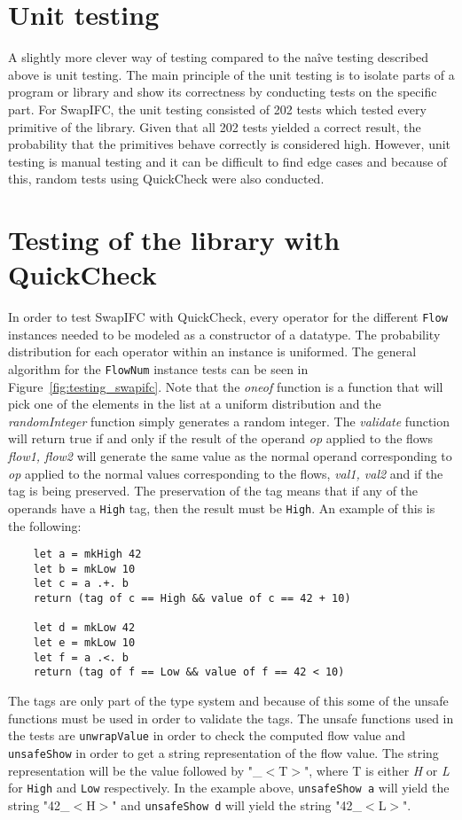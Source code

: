 \section{Unit testing}
A slightly more clever way of testing compared to the naîve testing described above is unit testing. The main principle of the unit testing is to isolate parts of a program or library and show its correctness by conducting tests on the specific part. For SwapIFC, the unit testing consisted of 202 tests which tested every primitive of the library. Given that all 202 tests yielded a correct result, the probability that the primitives behave correctly is considered high. However, unit testing is manual testing and it can be difficult to find edge cases and because of this, random tests using QuickCheck were also conducted.

\section{Testing of the library with QuickCheck}
In order to test SwapIFC with QuickCheck, every operator for the different {\tt Flow} instances needed to be modeled as a constructor of a datatype. The probability distribution for each operator within an instance is uniformed. The general algorithm for the {\tt FlowNum} instance tests can be seen in Figure~\ref{fig:testing_swapifc}. Note that the \emph{oneof} function is a function that will pick one of the elements in the list at a uniform distribution and the \emph{randomInteger} function simply generates a random integer. The \emph{validate} function will return true if and only if the result of the operand \emph{op} applied to the flows \emph{flow1, flow2} will generate the same value as the normal operand corresponding to \emph{op} applied to the normal values corresponding to the flows, \emph{val1, val2} and if the tag is being preserved. The preservation of the tag means that if any of the operands have a {\tt High} tag, then the result must be {\tt High}. An example of this is the following:
\begin{verbatim}
    let a = mkHigh 42
    let b = mkLow 10
    let c = a .+. b
    return (tag of c == High && value of c == 42 + 10)

    let d = mkLow 42
    let e = mkLow 10
    let f = a .<. b
    return (tag of f == Low && value of f == 42 < 10)
\end{verbatim}

The tags are only part of the type system and because of this some of the unsafe functions must be used in order to validate the tags. The unsafe functions used in the tests are {\tt unwrapValue} in order to check the computed flow value and {\tt unsafeShow} in order to get a string representation of the flow value. The string representation will be the value followed by "\_$<$T$>$", where T is either \emph{H} or \emph{L} for {\tt High} and {\tt Low} respectively. In the example above, {\tt unsafeShow a} will yield the string "42\_$<$H$>$" and {\tt unsafeShow d} will yield the string "42\_$<$L$>$".

